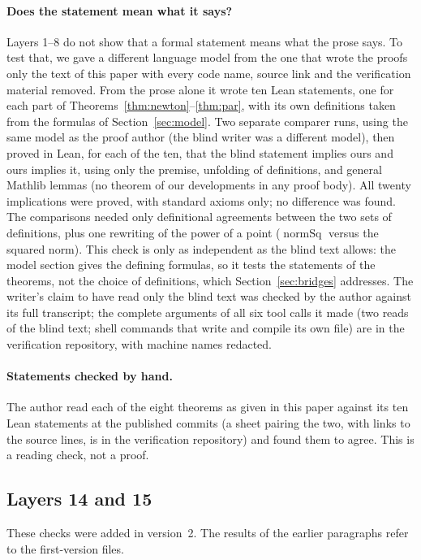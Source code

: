 \documentclass[11pt]{article}
\theoremstyle{definition}
\theoremstyle{remark}
\begin{document}
\paragraph{Does the statement mean what it says?}\label{sec:blind} Layers 1--8 do not show that a formal
statement means what the prose says. To test that, we gave a different language model from the one that
wrote the proofs only the text of this paper with every code name, source link and the verification
material removed. From the prose alone it wrote ten Lean statements, one for each part of
Theorems~\ref{thm:newton}--\ref{thm:par}, with its own definitions taken from the formulas of
Section~\ref{sec:model}. Two separate comparer runs, using the same model as the proof author (the blind
writer was a different model), then proved in Lean, for each of the ten, that the blind statement
implies ours and ours implies it, using only the premise, unfolding of definitions, and
general Mathlib lemmas (no theorem of our developments in any proof body). All twenty implications were
proved, with standard axioms only; no difference was found. The comparisons needed only definitional
agreements between the two sets of definitions, plus one rewriting of the power of a point
($\operatorname{normSq}$ versus the squared norm). This check is only as independent as the blind text
allows: the model section gives the defining formulas, so it tests the statements of the theorems, not
the choice of definitions, which Section~\ref{sec:bridges} addresses. The writer's claim to have read
only the blind text was checked by the author against its full transcript; the complete arguments of
all six tool calls it made (two reads of the blind text; shell commands that write and compile its own
file) are in the verification repository, with machine names redacted.

\paragraph{Statements checked by hand.} The author read each of the eight theorems as given in this
paper against its ten Lean statements at the published commits (a sheet pairing the two, with links to
the source lines, is in the verification repository) and found them to agree. This is a reading check, not a
proof.

\subsection{Layers 14 and 15}\label{sec:l1415}
These checks were added in version~2. The results of the earlier paragraphs refer to the first-version
files.
\end{document}
